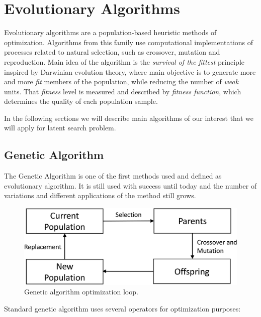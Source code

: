 \documentclass[12pt,a4paper,openany]{book}
\begin{document}
\section{Evolutionary Algorithms}

\noindent Evolutionary algorithms are a population-based heuristic methods of optimization. Algorithms from this family use computational implementations of processes related to natural selection, such as crossover, mutation and reproduction. Main idea of the algorithm is the \textit{survival of the fittest} principle inspired by Darwinian evolution theory, where main objective is to generate more and more \textit{fit} members of the population, while reducing the number of \textit{weak} units. That \textit{fitness} level is measured and described by \textit{fitness function}, which determines the quality of each population sample.

\noindent In the following sections we will describe main algorithms of our interest that we will apply for latent search problem. 
\subsection{Genetic Algorithm}


\noindent The Genetic Algorithm is one of the first methods used and defined as evolutionary algorithm. It is still used with success until today and the number of variations and different applications of the method still grows.

 \begin{figure}[ht!]
     \centering
     \includegraphics[scale=0.22]{figs/gen-algo.eps}
     \caption{Genetic algorithm optimization loop.}\label{Fig:genalgo1}
 \end{figure}


\noindent Standard genetic algorithm uses several operators for optimization purposes:

\end{document}
